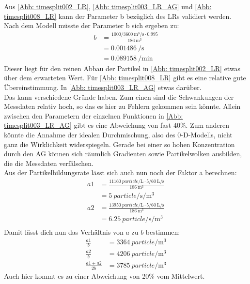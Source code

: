 \documentclass[12pt,a4paper,bibtotocnumbered,liststotocnumbered]{scrreprt}
\begin{document}
Aus \autoref{Abb: timesplit002_LR}, \ref{Abb: timesplit003_LR_AG} und \ref{Abb: timesplit008_LR} kann der Parameter b bezüglich des \acp{LR} validiert werden. Nach dem Modell müsste der Parameter b sich ergeben zu:
\begin{align}
b &= \frac{1000/\SI{3600}{\cubic\meter\per\second}   \cdot  0.995}{\SI{186}{\cubic\meter}}\\
&= \SI{0.001486}{\per\second} \\
&= \SI{0.089158}{\per\minute}
\end{align}
Dieser liegt für den reinen Abbau der Partikel in  \autoref{Abb: timesplit002_LR} etwas über dem erwarteten Wert. Für  \autoref{Abb: timesplit008_LR} gibt es eine relative gute Übereinstimmung. In \autoref{Abb: timesplit003_LR_AG} etwas darüber. \\
Das kann verschiedene Gründe haben. Zum einen sind die Schwankungen der Messdaten relativ hoch, so das es hier zu Fehlern gekommen sein könnte. Allein zwischen den Parametern der einzelnen Funktionen in \autoref{Abb: timesplit003_LR_AG} gibt es eine Abweichung von fast 40\%. Zum anderen könnte die Annahme der idealen Durchmischung, also des 0-D-Modells, nicht ganz die Wirklichkeit widerspiegeln. Gerade bei einer so hohen Konzentration durch den \ac{AG} können sich räumlich Gradienten sowie Partikelwolken ausbilden, die die Messdaten verfälschen.\\
Aus der Partikelbildungsrate lässt sich auch nun noch der Faktor a berechnen:
\begin{align}
a1 &= \frac{\SI{11160}{particle\per\liter}   \cdot   5/\SI{60}{\liter\per\second}}{\SI{186}{\cubic\meter}}\\
&= \SI{5}{particle\per\second\per\cubic\meter} \\
a2 &= \frac{\SI{13950}{particle\per\liter}   \cdot   5/\SI{60}{\liter\per\second}}{\SI{186}{\cubic\meter}}\\
&= \SI{6.25}{particle\per\second\per\cubic\meter} \\
\end{align}
Damit lässt dich nun das Verhältnis von $a$ zu $b$ bestimmen:
\begin{align}
\frac{a1}{b} &=   \SI{3364}{particle\per\cubic\meter} \\
\frac{a2}{b} &=   \SI{4206}{particle\per\cubic\meter}  \\
\frac{a1 + a2}{2 b} &=   \SI{3785}{particle\per\cubic\meter} 
\end{align}
Auch hier kommt es zu einer Abweichung von 20\% vom Mittelwert.\\
\end{document}
